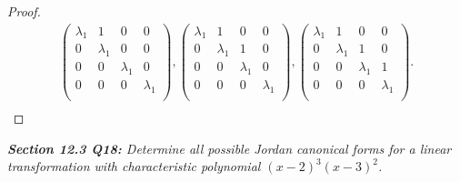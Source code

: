 \documentclass{article}
\begin{document}
\begin{proof}
\begin{align*}
        \begin{pmatrix} \lambda_1&1&0&0\\ 0&\lambda_1&0&0\\
          0&0&\lambda_1&0\\ 0&0&0&\lambda_1\\ \end{pmatrix},
        \begin{pmatrix} \lambda_1&1&0&0\\ 0&\lambda_1&1&0\\
          0&0&\lambda_1&0\\ 0&0&0&\lambda_1\\ \end{pmatrix},
        \begin{pmatrix} \lambda_1&1&0&0\\ 0&\lambda_1&1&0\\
          0&0&\lambda_1&1\\ 0&0&0&\lambda_1\\ \end{pmatrix}.\\
    \end{align*}
  \end{proof}

\it \textbf{Section 12.3 Q18:} Determine all possible Jordan canonical
  forms for a linear transformation with characteristic polynomial
  $(x-2)^3(x-3)^2$.
\end{document}
